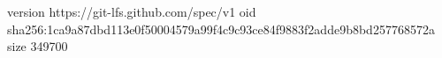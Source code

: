 version https://git-lfs.github.com/spec/v1
oid sha256:1ca9a87dbd113e0f50004579a99f4c9c93ce84f9883f2adde9b8bd257768572a
size 349700
